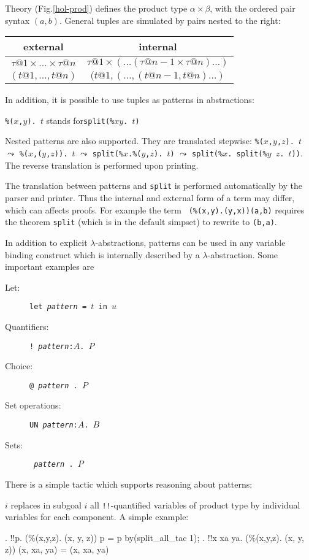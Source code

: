 Theory  (Fig.\ts\ref{hol-prod}) defines the product type
$\alpha\times\beta$, with the ordered pair syntax $(a, b)$.  General
tuples are simulated by pairs nested to the right:
\begin{center}
\begin{tabular}{c|c}
external & internal \\
\hline
$\tau@1 \times \dots \times \tau@n$ & $\tau@1 \times (\dots (\tau@{n-1} \times \tau@n)\dots)$ \\
\hline
$(t@1,\dots,t@n)$ & $(t@1,(\dots,(t@{n-1},t@n)\dots)$ \\
\end{tabular}
\end{center}
In addition, it is possible to use tuples
as patterns in abstractions:
\begin{center}
{\tt\%($x$,$y$). $t$} \quad stands for\quad \texttt{split(\%$x$\thinspace$y$.\ $t$)} 
\end{center}
Nested patterns are also supported.  They are translated stepwise:
{\tt\%($x$,$y$,$z$). $t$} $\leadsto$ {\tt\%($x$,($y$,$z$)). $t$} $\leadsto$
{\tt split(\%$x$.\%($y$,$z$). $t$)} $\leadsto$ \texttt{split(\%$x$. split(\%$y$
  $z$.\ $t$))}.  The reverse translation is performed upon printing.
\begin{warn}
  The translation between patterns and \texttt{split} is performed automatically
  by the parser and printer.  Thus the internal and external form of a term
  may differ, which can affects proofs.  For example the term {\tt
  (\%(x,y).(y,x))(a,b)} requires the theorem \texttt{split} (which is in the
  default simpset) to rewrite to {\tt(b,a)}.
\end{warn}
In addition to explicit $\lambda$-abstractions, patterns can be used in any
variable binding construct which is internally described by a
$\lambda$-abstraction.  Some important examples are
\begin{description}
\item[Let:] \texttt{let {\it pattern} = $t$ in $u$}
\item[Quantifiers:] \texttt{!~{\it pattern}:$A$.~$P$}
\item[Choice:] {\underscoreon \tt @~{\it pattern}~.~$P$}
\item[Set operations:] \texttt{UN~{\it pattern}:$A$.~$B$}
\item[Sets:] \texttt{{\ttlbrace}~{\it pattern}~.~$P$~{\ttrbrace}}
\end{description}

There is a simple tactic which supports reasoning about patterns:
\begin{ttdescription}
\item[\ttindexbold{split_all_tac} $i$] replaces in subgoal $i$ all
  {\tt!!}-quantified variables of product type by individual variables for
  each component.  A simple example:
\begin{ttbox}
{. !!p. (\%(x,y,z). (x, y, z)) p = p}
by(split_all_tac 1);
{. !!x xa ya. (\%(x,y,z). (x, y, z)) (x, xa, ya) = (x, xa, ya)}
\end{ttbox}
\end{ttdescription}

